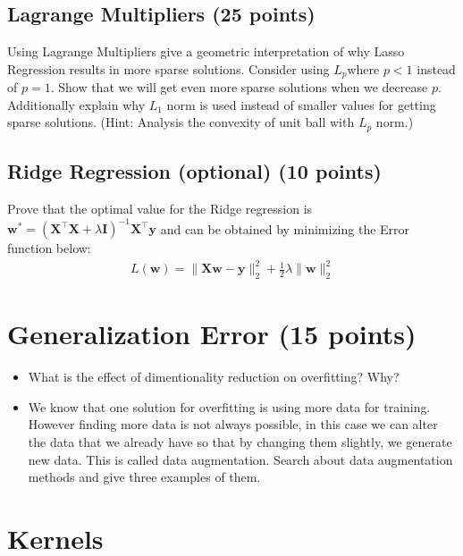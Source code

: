 \documentclass[a4paper]{article}
\begin{document}
        \subsection{Lagrange Multipliers (25 points)}
        Using Lagrange Multipliers give a geometric interpretation of why Lasso Regression results in more sparse solutions. Consider using $L_p $where $p<1$ instead of $p=1$. Show that we will get even more sparse solutions when we decrease $p$. Additionally explain why $L_1$ norm is used instead of smaller values for getting sparse solutions. (Hint: Analysis the convexity of unit ball with $L_p$ norm.)
        \subsection{Ridge Regression (optional) (10 points)} 
        Prove that the optimal value for the Ridge regression is $\mathbf{w}^{*} = (\mathbf{X}^{\top}\mathbf{X} + \lambda \mathbf{I})^{-1}\mathbf{X}^{\top}\mathbf{y}$ and can be obtained by minimizing the Error function below:
        \begin{align}
        L(\mathbf{w}) = \|\mathbf{X}\mathbf{w} - \mathbf{y}\|_{2}^{2} + \frac{1}{2}\lambda\|\mathbf{w}\|_{2}^{2}
        \end{align}
        \bigskip

    
        \section{Generalization Error (15 points)}
        \begin{itemize}
        \item What is the effect of dimentionality reduction on overfitting? Why?
        \item We know that one solution for overfitting is using more data for training. However finding more data is not always possible, in this case we can alter the data that we already have so that by changing them slightly, we generate new data. This is called data augmentation. Search about data augmentation methods and give three examples of them.
        \end{itemize}
        \bigskip

	\section{Kernels}
\end{document}
